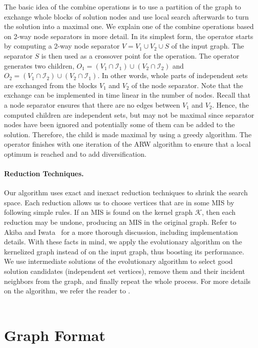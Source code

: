 \documentclass[11pt]{article}
\begin{document}
The basic idea of the combine operations is to use a partition of the graph to exchange whole blocks of solution nodes and use local search afterwards to turn the solution into a maximal one.
We explain one of the combine operations based on 2-way node separators in more detail.
In its simplest form, the operator starts by computing a 2-way node separator $V=V_1 \cup V_2 \cup S$ of the input graph. 
The separator $S$ is then used as a crossover point for the operation.
The operator generates two children, $O_1=(V_1\cap \mathcal{I}_1) \cup (V_2\cap\mathcal{I}_2)$ and $O_2=(V_1\cap \mathcal{I}_2) \cup (V_2\cap\mathcal{I}_1)$.  
In other words, whole parts of independent sets are exchanged from the blocks $V_1$ and $V_2$ of the node separator. 
Note that the exchange can be implemented in time linear in the number of nodes.
Recall that a node separator ensures that there are no edges between $V_1$ and $V_2$.
Hence, the computed children are independent sets, but may not be maximal since separator nodes have been ignored and potentially some of them can be added to the solution.
Therefore, the child is made maximal by using a greedy algorithm. 
The operator finishes with one iteration of the ARW algorithm to ensure that a local optimum is reached and to add diversification.

\paragraph{Reduction Techniques.}
Our algorithm uses exact and inexact reduction techniques to shrink the search space.
Each reduction allows us to choose vertices that are in some MIS by following simple rules. If an MIS is found on the kernel graph $\mathcal{K}$, then each reduction may be undone, producing an MIS in the original graph. Refer to Akiba and Iwata~\cite{akiba-2015} for a more thorough discussion, including implementation details. 
With these facts in mind, we apply the evolutionary algorithm on the  kernelized graph instead of on the input graph, thus boosting its performance.
We use intermediate solutions of the evolutionary algorithm to select good solution candidates (independent set vertices), remove them and their incident neighbors from the graph, and finally repeat the whole process. For more details on the algorithm, we refer the reader to \cite{alx2016IS}.
\\

\vfill
\pagebreak
\,
\pagebreak
\section{Graph Format}
\label{ss:graphformat}
\end{document}
